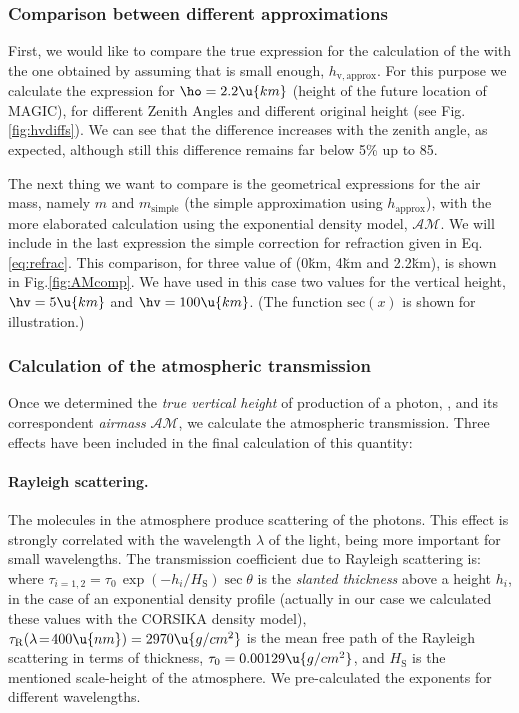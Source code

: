 \subsubsection{Comparison between different approximations}

First, we would like to compare the true expression for the
calculation of the \hv with the one obtained by assuming that \ho is
small enough, $h_{\mathrm{v,approx}}$. For this purpose we calculate
the expression
%
\diffhveq
%
for $\ho=2.2\u{km}$ (height of the future location of MAGIC), for
different Zenith Angles and different original height \hc (see
Fig.\ref{fig:hvdiffs}). We can see that the difference increases with
the zenith angle, as expected, although still this difference remains
far below 5\% up to 85\deg.

\hvdiffsfig
%
The next thing we want to compare is the geometrical expressions for
the air mass, namely $m$ and $m_{\mathrm{simple}}$ (the simple
approximation using $h_{\mathrm{approx}}$), with the more elaborated
calculation using the exponential density model, $\mathcal{AM}$. We
will include in the last expression the simple correction for
refraction given in Eq.\eqref{eq:refrac}. This comparison, for three
value of \ho (0\u{km}, 4\u{km} and 2.2\u{km}), is shown in
Fig.\ref{fig:AMcomp}. We have used in this case two values for the
vertical height, $\hv=5\u{km}$ and $\hv=100\u{km}$. (The function
$\mathrm{sec}(x)$ is shown for illustration.)

\AMcompfig

\afterpage{\clearpage}

\subsubsection{Calculation of the atmospheric transmission}

Once we determined the \emph{true vertical height} of production of a
photon, \hv, and its correspondent \emph{airmass} $\mathcal{AM}$, we
calculate the atmospheric transmission. Three effects have been
included in the final calculation of this quantity:

\paragraph{Rayleigh scattering.} The molecules in the atmosphere
produce scattering of the photons. This effect is strongly correlated
with the wavelength $\lambda$ of the light, being more important for
small wavelengths. The transmission coefficient due to Rayleigh
scattering is:
%
\Rayleigheq
%
where $\tau_{i=1,2} = \tau_0 \, \exp(-h_i/H_{\mathrm{S}}) \sec\theta$
is the \emph{slanted thickness} above a height $h_i$, in the case of
an exponential density profile (actually in our case we calculated
these values with the CORSIKA density model),
$\tau_{\mathrm{R}}(\lambda\!=\!400\u{nm}) = 2970\u{g/cm^2}$ is the
mean free path of the Rayleigh scattering in terms of thickness,
$\tau_0 = 0.00129\u{g/cm^2}$, and $H_{\mathrm{S}}$ is the mentioned
scale-height of the atmosphere. We pre-calculated the exponents for
different wavelengths.
  
